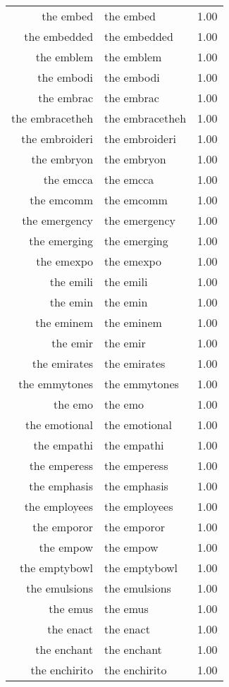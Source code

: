 \begin{table}[ht]
\begin{tabular}{rlr}
  the embed & the embed & 1.00 \\ 
  the embedded & the embedded & 1.00 \\ 
  the emblem & the emblem & 1.00 \\ 
  the embodi & the embodi & 1.00 \\ 
  the embrac & the embrac & 1.00 \\ 
  the embracetheh & the embracetheh & 1.00 \\ 
  the embroideri & the embroideri & 1.00 \\ 
  the embryon & the embryon & 1.00 \\ 
  the emcca & the emcca & 1.00 \\ 
  the emcomm & the emcomm & 1.00 \\ 
  the emergency & the emergency & 1.00 \\ 
  the emerging & the emerging & 1.00 \\ 
  the emexpo & the emexpo & 1.00 \\ 
  the emili & the emili & 1.00 \\ 
  the emin & the emin & 1.00 \\ 
  the eminem & the eminem & 1.00 \\ 
  the emir & the emir & 1.00 \\ 
  the emirates & the emirates & 1.00 \\ 
  the emmytones & the emmytones & 1.00 \\ 
  the emo & the emo & 1.00 \\ 
  the emotional & the emotional & 1.00 \\ 
  the empathi & the empathi & 1.00 \\ 
  the emperess & the emperess & 1.00 \\ 
  the emphasis & the emphasis & 1.00 \\ 
  the employees & the employees & 1.00 \\ 
  the emporor & the emporor & 1.00 \\ 
  the empow & the empow & 1.00 \\ 
  the emptybowl & the emptybowl & 1.00 \\ 
  the emulsions & the emulsions & 1.00 \\ 
  the emus & the emus & 1.00 \\ 
  the enact & the enact & 1.00 \\ 
  the enchant & the enchant & 1.00 \\ 
  the enchirito & the enchirito & 1.00 \\ 

\end{tabular}
\end{table}
